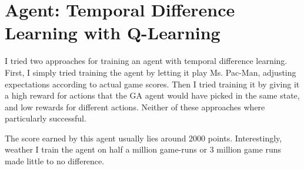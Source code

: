 \section{Agent: Temporal Difference Learning with Q-Learning}
\label{sec:qlearning}
I tried two approaches for training an agent with temporal difference learning.
First, I simply tried training the agent by letting it play Ms. Pac-Man,
adjusting expectations according to actual game scores. Then I tried training it
by giving it a high reward for actions that the GA agent would have picked in the
same state, and low rewards for different actions. Neither of these approaches
where particularly successful.

The score earned by this agent usually lies around 2000 points.
Interestingly, weather I train the agent on half a million game-runs or 3
million game runs made little to no difference.


